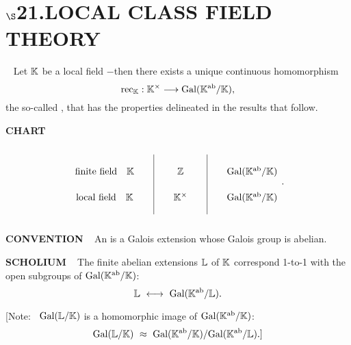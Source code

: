 \chapter{
$\boldsymbol{\S}$\textbf{21}.\quad  LOCAL CLASS FIELD THEORY}
\setlength\parindent{2em}
\setcounter{theoremn}{0}

\ \indent 
Let $\mathbb{K}$ be a local field $-$then there exists a unique continuous homomorphism 
\[
\text{rec}_{\mathbb{K}} : \mathbb{K}^\times \longrightarrow \text{Gal}(\mathbb{K}^{\text{ab}} /\mathbb{K}),
\]
the so-called , that has the properties delineated in the results that follow.

\vspace{0.3cm}

\begin{x}{\small\bf CHART} \ %

\[
\begin{tikzcd}[sep=small]
{}     &{} \ar[dash]{ddd} &{}    &{} \ar[dash]{ddd} &{}\\
{\text{finite field} \quad \K}  &{}                      &{\Z} &{}                      &{\Gal(\K^\ab /\K)}\\
{\text{local field} \quad \K}  &{}                      &{\K^\times} &{}                      &{\Gal(\K^\ab /\K)}\\
{}     &{}  &{}    &{}  &{}
\end{tikzcd}
.
\]

\end{x}

\vspace{0.1cm}

\begin{x}{\small\bf CONVENTION} \ %
An  is a Galois extension whose Galois group is abelian.
\end{x}

\vspace{0.1cm}

\begin{x}{\small\bf SCHOLIUM} \ %
The finite abelian extensions $\mathbb{L}$ of $\mathbb{K}$ correspond 1-to-1 with the open subgroups of $\text{Gal}(\mathbb{K}^{\text{ab}}/\mathbb{K})$: 
\[
\LL \ \longleftrightarrow \ \Gal(\K^\ab/\LL).
\]

[Note: \ $\text{Gal}(\mathbb{L}/\mathbb{K})$ is a homomorphic image of $\text{Gal}(\mathbb{K}^{\text{ab}}/\mathbb{K})$:
\[
\text{Gal}(\mathbb{L}/\mathbb{K}) \ \approx \ \text{Gal}(\mathbb{K}^{\text{ab}}/\mathbb{K}) / \text{Gal}(\mathbb{K}^{\text{ab}}/\mathbb{L}).]
\]
\end{x}

\vspace{0.1cm}

